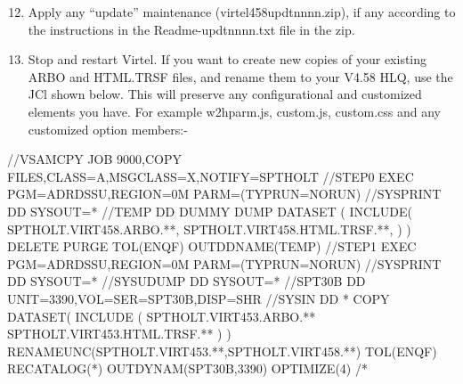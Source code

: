 \documentclass[letterpaper,10pt,english]{sphinxmanual}
\begin{document}
\newpage
\begin{enumerate}
\setcounter{enumi}{11}
\item {} 
Apply any “update” maintenance (virtel458updtnnnn.zip), if any according to the instructions in the Readme-updtnnnn.txt file in the zip.

\item {} 
Stop and restart Virtel. If you want to create new copies of your existing ARBO and HTML.TRSF files, and rename them to your V4.58 HLQ, use the JCl shown below. This will preserve any configurational and customized elements you have. For example w2hparm.js, custom.js, custom.css and any customized option members:-

\end{enumerate}

\begin{sphinxVerbatim}[commandchars=\\\{\}]
//\PYGZdl{}VSAMCPY JOB 9000,\PYGZsq{}COPY FILES\PYGZsq{},CLASS=A,MSGCLASS=X,NOTIFY=SPTHOLT
//STEP0   EXEC PGM=ADRDSSU,REGION=0M PARM=(\PYGZsq{}TYPRUN=NORUN\PYGZsq{})
//SYSPRINT DD SYSOUT=*
//TEMP DD DUMMY
 DUMP DATASET              \PYGZhy{}
      (                    \PYGZhy{}
       INCLUDE(            \PYGZhy{}
      SPTHOLT.VIRT458.ARBO.**, \PYGZhy{}
      SPTHOLT.VIRT458.HTML.TRSF.**, \PYGZhy{}
                )         \PYGZhy{}
      )                   \PYGZhy{}
      DELETE    \PYGZhy{}
      PURGE      \PYGZhy{}
      TOL(ENQF) \PYGZhy{}
      OUTDDNAME(TEMP)
//STEP1   EXEC PGM=ADRDSSU,REGION=0M PARM=(\PYGZsq{}TYPRUN=NORUN\PYGZsq{})
//SYSPRINT DD  SYSOUT=*
//SYSUDUMP DD  SYSOUT=*
//SPT30B   DD  UNIT=3390,VOL=SER=SPT30B,DISP=SHR
//SYSIN    DD  *
 COPY                                             \PYGZhy{}
       DATASET(                                   \PYGZhy{}
       INCLUDE (                                  \PYGZhy{}
       SPTHOLT.VIRT453.ARBO.**                    \PYGZhy{}
       SPTHOLT.VIRT453.HTML.TRSF.**               \PYGZhy{}
  )                                               \PYGZhy{}
  )\PYGZhy{}
  RENAMEUNC(SPTHOLT.VIRT453.**,SPTHOLT.VIRT458.**) \PYGZhy{}
  TOL(ENQF)   \PYGZhy{}
  RECATALOG(*) \PYGZhy{}
  OUTDYNAM(SPT30B,3390) \PYGZhy{}
  OPTIMIZE(4)
/*
\end{sphinxVerbatim}


\newpage

\end{document}
